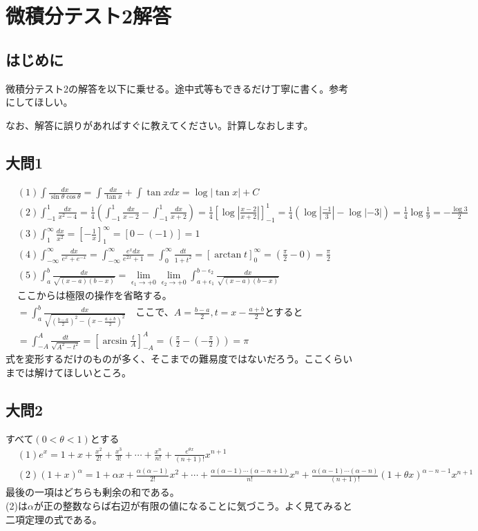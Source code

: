 \documentclass[a4j,dvipdfmx]{jsarticle}
\begin{document}
\section*{微積分テスト2解答}
\subsection*{はじめに}
微積分テスト2の解答を以下に乗せる。途中式等もできるだけ丁寧に書く。参考にしてほしい。

なお、解答に誤りがあればすぐに教えてください。計算しなおします。
\newpage
\subsection*{大問1}
\begin{align*}
    &(1)\int \frac{dx}{\sin\theta\cos\theta}=\int \frac{dx}{\tan x}+\int \tan xdx=\log|\tan x|+C\\
    &(2) \int_{-1}^{1}\frac{dx}{x^2-4}=\frac{1}{4}(\int_{-1}^1\frac{dx}{x-2}-\int_{-1}^1\frac{dx}{x+2})=\frac{1}{4}[\log|\frac{x-2}{x+2}|]_{-1}^1=\frac{1}{4}(\log|\frac{-1}{3}|-\log|-3|)=\frac{1}{4}\log\frac{1}{9}=-\frac{\log 3}{2}\\
    &(3) \int_1^{\infty}\frac{dx}{x^2}=[-\frac{1}{x}]_1^{\infty}=[0-(-1)]=1\\
    &(4)\int_{-\infty}^{\infty}\frac{dx}{e^x+e^{-x}}=\int_{-\infty}^{\infty}\frac{e^x dx}{e^{2x}+1}=\int_{0}^{\infty}\frac{dt}{1+t^2}=[\arctan t]_{0}^{\infty}=(\frac{\pi}{2}-0)=\frac{\pi}{2}\\
    &(5) \int_a^b \frac{dx}{\sqrt{(x-a)(b-x)}}=\lim_{\epsilon_1 \to +0}\lim_{\epsilon_2 \to +0}\int_{a+\epsilon_1}^{b-\epsilon_2}\frac{dx}{\sqrt{(x-a)(b-x)}}\\
    &\text{ここからは極限の操作を省略する。}\\
    &=\int_a^b\frac{dx}{\sqrt{(\frac{b-a}{2})^2-(x-\frac{a+b}{2})^2}}\quad\text{ここで、$A=\frac{b-a}{2},t=x-\frac{a+b}{2}$とすると}\\
    &=\int_{-A}^A\frac{dt}{\sqrt{A^2-t^2}}=[\arcsin \frac{t}{A}]_{-A}^{A}=(\frac{\pi}{2}-(-\frac{\pi}{2}))=\pi
\end{align*}
式を変形するだけのものが多く、そこまでの難易度ではないだろう。ここくらいまでは解けてほしいところ。

\subsection*{大問2}
すべて$(0<\theta<1)$とする
\begin{align*}
    &(1)e^x=1+x+\frac{x^2}{2!}+\frac{x^3}{3!}+\cdots+\frac{x^n}{n!}+\frac{e^{\theta x}}{(n+1)!}x^{n+1}\quad\\
    &(2)(1+x)^{\alpha}=1+\alpha x+\frac{\alpha(\alpha-1)}{2!}x^2+\cdots+\frac{\alpha(\alpha-1)\cdots(\alpha-n+1)}{n!}x^n+\frac{\alpha(\alpha-1)\cdots(\alpha-n)}{(n+1)!}(1+\theta x)^{\alpha-n-1}x^{n+1}
\end{align*}
最後の一項はどちらも剰余の和である。\\
(2)は$\alpha$が正の整数ならば右辺が有限の値になることに気づこう。よく見てみると二項定理の式である。
\newpage
\end{document}
